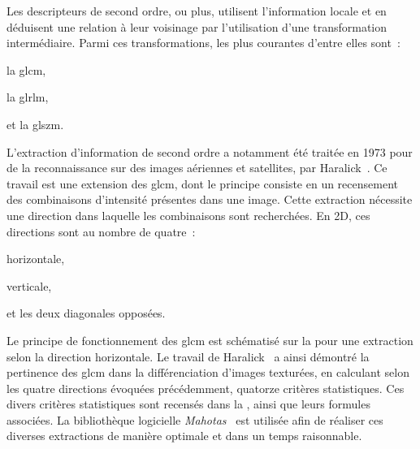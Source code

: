 Les descripteurs de second ordre, ou plus, utilisent l'information locale et en déduisent une relation à leur voisinage par l'utilisation d'une transformation intermédiaire. Parmi ces transformations, les plus courantes d'entre elles sont~:
\begin{inlinerate}
    \item la \gls{glcm},
    \item la \gls{glrlm},
    \item et la \gls{glszm}.
\end{inlinerate} 
L'extraction d'information de second ordre a notamment été traitée en 1973 pour de la reconnaissance sur des images aériennes et satellites, par Haralick~. Ce travail est une extension des \gls{glcm}, dont le principe consiste en un recensement des combinaisons d'intensité présentes dans une image. Cette extraction nécessite une direction dans laquelle les combinaisons sont recherchées. En 2D, ces directions sont au nombre de quatre~:
\begin{inlinerate}
    \item horizontale,
    \item verticale,
    \item et les deux diagonales opposées.
\end{inlinerate}
Le principe de fonctionnement des \gls{glcm} est schématisé sur la  pour une extraction selon la direction horizontale. Le travail de Haralick~ a ainsi démontré la pertinence des \gls{glcm} dans la différenciation d'images texturées, en calculant selon les quatre directions évoquées précédemment, quatorze critères statistiques. Ces divers critères statistiques sont recensés dans la , ainsi que leurs formules associées. La bibliothèque logicielle \textit{Mahotas}~\cite{Mahotas2013} est utilisée afin de réaliser ces diverses extractions de manière optimale et dans un temps raisonnable.\par
 
